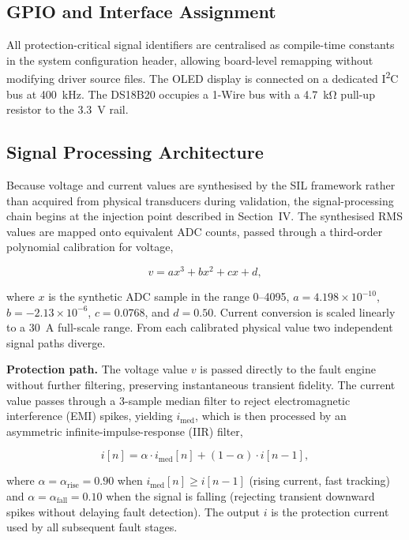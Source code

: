 \documentclass[conference]{IEEEtran}
\begin{document}
\subsection{GPIO and Interface Assignment}

All protection-critical signal identifiers are centralised as
compile-time constants in the system configuration header, allowing
board-level remapping without modifying driver source files.  The OLED
display is connected on a dedicated I\textsuperscript{2}C bus at
\SI{400}{\kilo\hertz}.  The DS18B20 occupies a 1-Wire bus with a
\SI{4.7}{\kilo\ohm} pull-up resistor to the \SI{3.3}{\volt} rail.

\subsection{Signal Processing Architecture}

Because voltage and current values are synthesised by the SIL framework
rather than acquired from physical transducers during validation, the
signal-processing chain begins at the injection point described in
Section~IV\@.  The synthesised RMS values are mapped onto equivalent
ADC counts, passed through a third-order polynomial calibration for
voltage,

\begin{equation}
  v = a x^3 + b x^2 + c x + d,
  \label{eq:poly_cal}
\end{equation}

\noindent
where $x$ is the synthetic ADC sample in the range 0--4095,
$a = 4.198 \times 10^{-10}$, $b = -2.13 \times 10^{-6}$,
$c = 0.0768$, and $d = 0.50$.  Current conversion is scaled linearly to
a \SI{30}{\ampere} full-scale range.  From each calibrated physical
value two independent signal paths diverge.

\textbf{Protection path.}  The voltage value $v$ is passed directly to
the fault engine without further filtering, preserving instantaneous
transient fidelity.  The current value passes through a 3-sample median
filter to reject electromagnetic interference (EMI) spikes, yielding
$i_{\text{med}}$, which is then processed by an asymmetric
infinite-impulse-response (IIR) filter,

\begin{equation}
  i[n] = \alpha \cdot i_{\text{med}}[n] + (1 - \alpha) \cdot i[n-1],
  \label{eq:asym_iir}
\end{equation}

\noindent
where $\alpha = \alpha_{\text{rise}} = 0.90$ when
$i_{\text{med}}[n] \geq i[n-1]$ (rising current, fast tracking) and
$\alpha = \alpha_{\text{fall}} = 0.10$ when the signal is falling
(rejecting transient downward spikes without delaying fault detection).
The output $i$ is the protection current used by all subsequent fault
stages.
\end{document}
